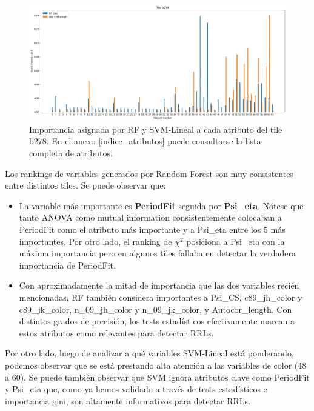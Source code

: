 \begin{figure}[h!]
\centering
  \includegraphics[width=1\textwidth]{Kap6/test=b278_ML_variable_importance_scores}
\caption{ Importancia asignada por RF y SVM-Lineal a cada atributo del tile b278. En el anexo \protect\ref{indice_atributos} puede consultarse la lista completa de atributos. }
\label{fig:ml_importance_b278}
\end{figure}

Los rankings de variables generados por Random Forest son muy consistentes entre distintos tiles. Se puede observar que:

\begin{itemize}
\item La variable más importante es \textbf{PeriodFit} seguida por \textbf{Psi\_eta}. Nótese que tanto ANOVA como mutual information consistentemente colocaban a PeriodFit como el atributo más importante y a Psi\_eta entre los 5 más importantes. Por otro lado, el ranking de $\chi^2$ posiciona a Psi\_eta con la máxima importancia pero en algunos tiles fallaba en detectar la verdadera importancia de PeriodFit.
\item Con aproximadamente la mitad de importancia que las dos variables recién mencionadas, RF también considera importantes a Psi\_CS, c89\_jh\_color y c89\_jk\_color, n\_09\_jh\_color y n\_09\_jk\_color, y Autocor\_length. Con distintos grados de precisión, los tests estadísticos efectivamente marcan a estos atributos como relevantes para detectar RRLs.
\end{itemize}

Por otro lado, luego de analizar a qué variables SVM-Lineal está ponderando, podemos observar que se está prestando alta atención a las variables de color (48 a 60). Se puede también observar que SVM ignora atributos clave como PeriodFit y Psi\_eta que, como ya hemos validado a través de tests estadísticos e importancia gini, son altamente informativos para detectar RRLs. \\

